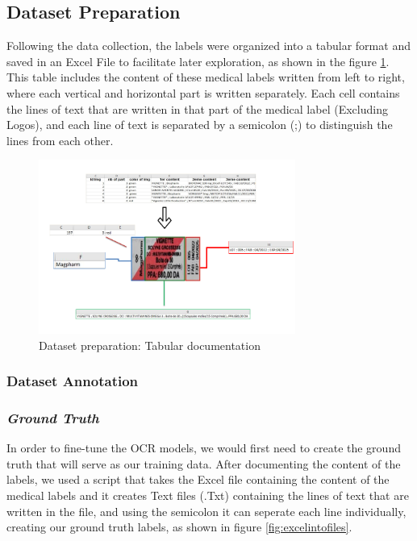 
\subsection{Dataset Preparation}
Following the data collection, the labels were organized into a tabular format and saved in an Excel File to facilitate later exploration, as shown in the figure \ref{fig:dataprep}. This table includes the content of these medical labels written from left to right, where each vertical and horizontal part is written separately.
Each cell contains the lines of text that are written in that part of the medical label (Excluding Logos), and each line of text is separated by a semicolon (;) to distinguish the lines from each other.

\begin{figure}[H]
    \centering
    \includegraphics[width=0.75\textwidth]{Figures/Chapter 3/Medical labels documentation.png}
    \caption{Dataset preparation: Tabular documentation}
    \label{fig:dataprep}
\end{figure}

\subsubsection{Dataset Annotation}
\subsubsection*{\textit{Ground Truth}}
In order to fine-tune the OCR models, we would first need to create the ground truth that will serve as our training data. 
After documenting the content of the labels, we used a script that takes the Excel file containing the content of the medical labels and it creates Text files (.Txt) containing the lines of text that are written in the file, and using the semicolon it can seperate each line individually, creating our ground truth labels, as shown in figure \ref{fig:excelintofiles}.

